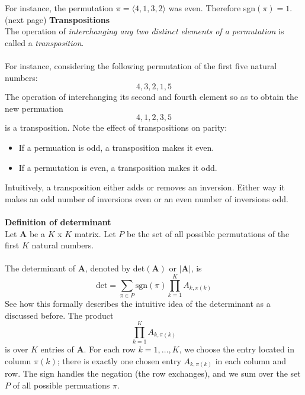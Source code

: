 \documentclass{report}
\begin{document}
For instance, the permutation $\pi=\langle 4,1,3,2\rangle$ was even. Therefore sgn$(\pi)=1$.\\
(next page)\newpage
\noindent\textbf{Transpositions}\\
The operation of \textit{interchanging any two distinct elements of a permutation} is called a \textit{transposition}.\\
\vspace{1mm}\\
For instance, considering the following permutation of the first five natural numbers:
\begin{equation*}
4,3,2,1,5
\end{equation*}
The operation of interchanging its second and fourth element so as to obtain the new permuation
\begin{equation*}
4,1,2,3,5
\end{equation*}
is a transposition. Note the effect of transpositions on parity:
\begin{itemize}
\item If a permuation is odd, a transposition makes it even.
\item If a permutation is even, a transposition makes it odd.
\end{itemize}
Intuitively, a transposition either adds or removes an inversion. Either way it makes an odd number of inversions even or an even number of inversions odd.\\
\vspace{1mm}\\
\textbf{Definition of determinant}\\
Let $\bm A$ be a $K$ x $K$ matrix. Let $P$ be the set of all possible permutations of the first $K$ natural numbers.\\
\vspace{1mm}\\
The determinant of $\bm A$, denoted by det$(\bm A)$ or $|\bm A|$, is
\begin{equation*}
\text{det}=\sum_{\pi\in P}\text{sgn}(\pi)\prod^K_{k=1}A_{k,\pi(k)}
\end{equation*}
See how this formally describes the intuitive idea of the determinant as a discussed before. The product
\begin{equation*}
\prod^K_{k=1}A_{k,\pi(k)}
\end{equation*}
is over $K$ entries of $\bm A$. For each row $k=1,\ldots,K$, we choose the entry located in column $\pi(k)$; there is exactly one chosen entry $A_{k,\pi(k)}$ in each
column and row. The sign handles the negation (the row exchanges), and we sum over the set $P$ of all possible permuations $\pi$.
\newpage
\end{document}
